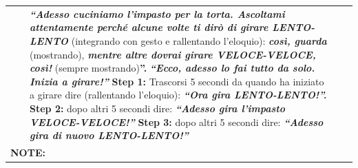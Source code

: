 {{\begin{tabular}{|p{3.2cm}|p{2.8cm}|p{7.8cm}|p{5.0cm}|p{1.0cm}|}
   &  & \textbf{\emph{``Adesso cuciniamo l'impasto per la torta. Ascoltami attentamente perché alcune volte ti dirò di girare LENTO-LENTO}} (integrando con gesto e rallentando l'eloquio): \textbf{\emph{così, guarda}} (mostrando), \textbf{\emph{mentre altre dovrai girare VELOCE-VELOCE, così!}} (sempre mostrando)\textbf{''.} \newline \textbf{\emph{``Ecco, adesso lo fai tutto da solo. Inizia a girare!''}} \newline \textbf{Step 1: }Trascorsi 5 secondi da quando ha iniziato a girare dire (rallentando l'eloquio): \textbf{\emph{``Ora gira LENTO-LENTO!''.}} \newline \textbf{Step 2: }dopo altri 5 secondi dire: \textbf{\emph{``Adesso gira l'impasto VELOCE-VELOCE!''}} \newline \textbf{Step 3: }dopo altri 5 secondi dire: \textbf{\emph{``Adesso gira di nuovo LENTO-LENTO!''}} &  &  \\
  \multicolumn{5}{|p{20.64cm}|}{\textbf{NOTE:}} \\
\bottomrule
\end{tabular}
}}

